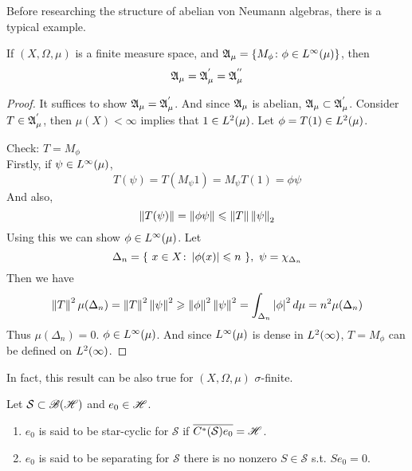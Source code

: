 \documentclass[a4paper,11pt]{report}
\begin{document}
Before researching the structure of abelian von Neumann algebras, there is a typical example.
\begin{exam}
	If $(X,\Omega,\mu)$ is a finite measure space, and $\mathfrak{A}_{\mu} = \{M_{\phi} \colon \phi \in L^{\infty}(\mu)\}$, then
	\begin{equation*}
		\mathfrak{A}_{\mu} = \mathfrak{A}_{\mu}^{'} = \mathfrak{A}_{\mu}^{''}
	\end{equation*}
\end{exam}
\begin{proof}
	It suffices to show $\mathfrak{A}_{\mu} = \mathfrak{A}_{\mu}^{'}$. And since $\mathfrak{A}_{\mu}$ is abelian, $\mathfrak{A}_{\mu} \subset \mathfrak{A}_{\mu}^{'}$. Consider $T \in \mathfrak{A}_{\mu}^{'}$, then $\mu(X) < \infty$ implies that $1 \in L^{2}(\mu)$. Let $\phi = T(1) \in L^{2}(\mu)$. 
	\item Check: $T=M_{\phi}$ \\
	Firstly, if $\psi \in L^{\infty}(\mu)$, 
	\begin{equation*}
		T(\psi) = T(M_{\psi}1) = M_{\psi}T(1) = \phi\psi
	\end{equation*}
	And also,
	\begin{equation*}
		\left\lVert T(\psi)\right\lVert = \left\lVert\phi\psi\right\lVert \leqslant \left\lVert T\right\lVert\left\lVert\psi\right\lVert_2
	\end{equation*}
	Using this we can show $\phi \in L^{\infty}(\mu)$. Let 
	\begin{equation*}
		\Delta_n = \{~ x \in X \colon \left\lvert\phi(x)\right\lvert \leqslant n ~\},~ \psi = \chi_{\Delta_n}
	\end{equation*}
	Then we have 
	\begin{equation*}
		\left\lVert T\right\lVert^2\mu(\Delta_n) = \left\lVert T\right\lVert^2 \left\lVert\psi\right\lVert^2 \geqslant \left\lVert\phi\right\lVert^2\left\lVert\psi\right\lVert^2 = \int_{\Delta_n}\left\lvert\phi\right\lvert^2 d\mu = n^2\mu(\Delta_n)
	\end{equation*}
	Thus $\mu(\Delta_n)=0$. $\phi \in L^{\infty}(\mu)$. And since $L^{\infty}(\mu)$ is dense in $L^{2}(\infty)$, $T=M_{\phi}$ can be defined on $L^{2}(\infty)$.
\end{proof}
\begin{rem}
	In fact, this result can be also true for $(X,\Omega,\mu)$ $\sigma$-finite.
\end{rem}

\begin{defn}
	Let $\mathcal{S} \subset \mathscr{B(H)}$ and $e_0 \in \mathscr{H}$.
	\begin{enumerate}[label=\arabic*)]
		\item $e_0$ is said to be star-cyclic for $\mathcal{S}$ if $\overline{C^{*}(\mathcal{S})e_0} = \mathscr{H}$.
		\item $e_0$ is said to be separating for $\mathcal{S}$ there is no nonzero $S \in \mathcal{S}$ s.t. $Se_0=0$.
	\end{enumerate}
\end{defn}
\end{document}
